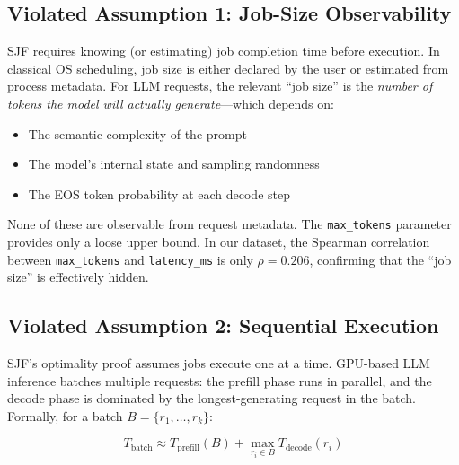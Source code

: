 \documentclass[conference]{IEEEtran}
\begin{document}
\subsection{Violated Assumption 1: Job-Size Observability}

SJF requires knowing (or estimating) job completion time before execution. In classical OS scheduling, job size is either declared by the user or estimated from process metadata. For LLM requests, the relevant ``job size'' is the \textit{number of tokens the model will actually generate}---which depends on:

\begin{itemize}
    \item The semantic complexity of the prompt
    \item The model's internal state and sampling randomness
    \item The EOS token probability at each decode step
\end{itemize}

None of these are observable from request metadata. The \texttt{max\_tokens} parameter provides only a loose upper bound. In our dataset, the Spearman correlation between \texttt{max\_tokens} and \texttt{latency\_ms} is only $\rho = 0.206$, confirming that the ``job size'' is effectively hidden.

\subsection{Violated Assumption 2: Sequential Execution}

SJF's optimality proof assumes jobs execute one at a time. GPU-based LLM inference batches multiple requests: the prefill phase runs in parallel, and the decode phase is dominated by the longest-generating request in the batch. Formally, for a batch $B = \{r_1, \ldots, r_k\}$:

\begin{equation}
T_{\text{batch}} \approx T_{\text{prefill}}(B) + \max_{r_i \in B} T_{\text{decode}}(r_i)
\label{eq:batch}
\end{equation}
\end{document}
